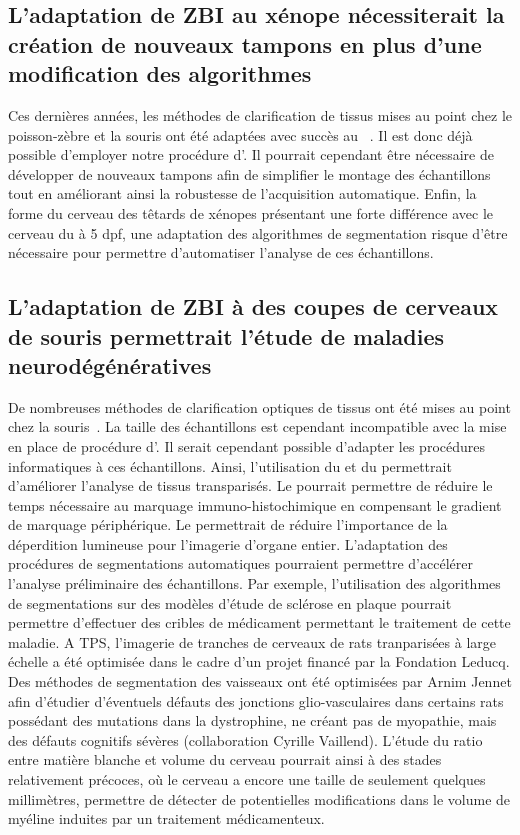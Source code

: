 \documentclass[\main/main.tex]{subfiles}
\begin{document}
    \subsection{L'adaptation de ZBI au xénope nécessiterait la création de nouveaux tampons en plus d'une modification des algorithmes}
%
Ces dernières années, les méthodes de clarification de tissus mises au point chez le poisson-zèbre et la souris ont été adaptées avec succès au \xl{}~\cite{fini_2017,affaticati_2018}.
%
Il est donc déjà possible d'employer notre procédure d'\hti.
%
Il pourrait cependant être nécessaire de développer de nouveaux tampons afin de simplifier le montage des échantillons
tout en améliorant ainsi la robustesse de l'acquisition automatique.
%
Enfin, la forme du cerveau des têtards de xénopes présentant une forte différence avec le cerveau du \pz{} à 5 dpf,
une adaptation des algorithmes de segmentation risque d'être nécessaire pour permettre d'automatiser l'analyse de ces échantillons.

    \subsection{L'adaptation de ZBI à des coupes de cerveaux de souris permettrait l'étude de maladies neurodégénératives}
    
De nombreuses méthodes de clarification optiques de tissus ont été mises au point chez la souris~\cite{tainaka_2016,tomer_2014}.
%
La taille des échantillons est cependant incompatible avec la mise en place de procédure d'\hti{}.
%
Il serait cependant possible d'adapter les procédures informatiques à ces échantillons.
%
Ainsi, l'utilisation du \sbddcc{} et du \sblc{} permettrait d'améliorer l'analyse de tissus transparisés.
%
Le \sblc{} pourrait permettre de réduire le temps nécessaire au marquage immuno-histochimique en compensant le gradient de marquage périphérique.
%
Le \sbddcc{} permettrait de réduire l'importance de la déperdition lumineuse pour l'imagerie d'organe entier.
%
L'adaptation des procédures de segmentations automatiques pourraient permettre d'accélérer l'analyse préliminaire des échantillons.
%
Par exemple, l'utilisation des algorithmes de segmentations sur des modèles d'étude de sclérose en plaque pourrait permettre d'effectuer des cribles de médicament permettant le traitement de cette maladie.
%
A TPS, l'imagerie de tranches de cerveaux de rats tranparisées à large échelle  a été optimisée dans le cadre d'un projet financé par la Fondation Leducq. Des méthodes de segmentation des vaisseaux ont été optimisées par Arnim Jennet afin d'étudier d'éventuels défauts des jonctions glio-vasculaires dans certains rats possédant des mutations dans la dystrophine, ne créant pas de myopathie, mais des défauts cognitifs sévères (collaboration Cyrille Vaillend).  
%
L'étude du ratio entre matière blanche et volume du cerveau pourrait ainsi à des stades relativement précoces, où le cerveau a encore une taille de seulement quelques millimètres, permettre de détecter de potentielles modifications dans le volume de myéline induites par un traitement médicamenteux.
\end{document}
